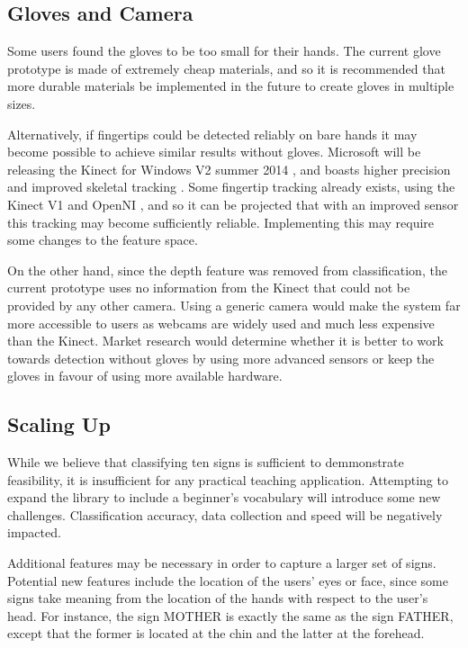\documentclass[12pt]{article}
\begin{document}
\subsection{Gloves and Camera}
Some users found the gloves to be too small for their hands. The current glove prototype is made of extremely cheap materials, and so it is recommended that more durable materials be implemented in the future to create gloves in multiple sizes. 

Alternatively, if fingertips could be detected reliably on bare hands it may become possible to achieve similar results without gloves. Microsoft will be releasing the Kinect for Windows V2 summer 2014 \cite{kinect2}, and boasts higher precision and improved skeletal tracking \cite{kinect2capabilities}. Some fingertip tracking already exists, using the Kinect V1 and OpenNI \cite{fingertips}, and so it can be projected that with an improved sensor this tracking may become sufficiently reliable. Implementing this may require some changes to the feature space.

On the other hand, since the depth feature was removed from classification, the current prototype uses no information from the Kinect that could not be provided by any other camera. Using a generic camera would make the system far more accessible to users as webcams are widely used and much less expensive than the Kinect. Market research would determine whether it is better to work towards detection without gloves by using more advanced sensors or keep the gloves in favour of using more available hardware.

\subsection{Scaling Up}
While we believe that classifying ten signs is sufficient to demmonstrate feasibility, it is insufficient for any practical teaching application. Attempting to expand the library to include a beginner's vocabulary will introduce some new challenges. Classification accuracy, data collection and speed will be negatively impacted.

Additional features may be necessary in order to capture a larger set of signs. Potential new features include the location of the users’ eyes or face, since some signs take meaning from the location of the hands with respect to the user’s head. For instance, the sign MOTHER is exactly the same as the sign FATHER, except that the former is located at the chin and the latter at the forehead.
\end{document}

